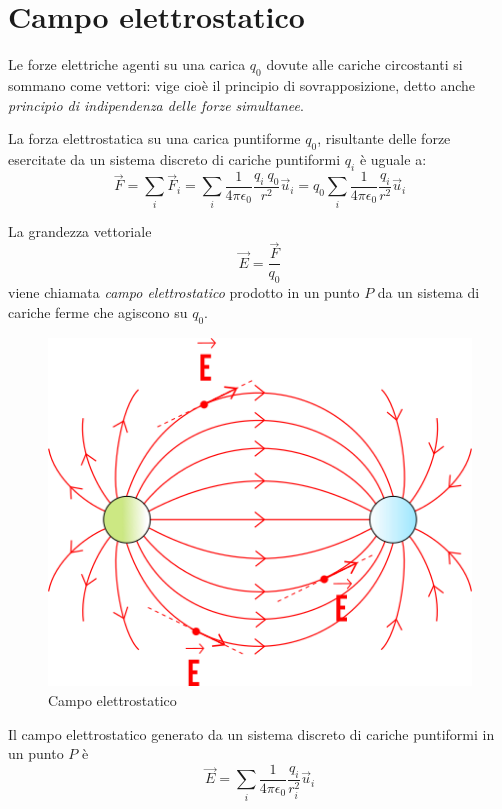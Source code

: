 \documentclass[class=book, crop=false, oneside, 12pt]{standalone}
\begin{document}
\section{Campo elettrostatico}

Le forze elettriche agenti su una carica \(q_0\) dovute alle cariche circostanti si sommano come vettori: vige cioè il principio di sovrapposizione, detto anche \emph{principio di indipendenza delle forze simultanee}.

La forza elettrostatica su una carica puntiforme \(q_0\), risultante delle forze esercitate da un sistema discreto di cariche puntiformi \(q_i\) è uguale a: 
\begin{equation}
    \overrightarrow{F} = \sum_i \overrightarrow{F}_i = \sum_i \frac{1}{4 \pi \epsilon_0} \frac{q_i \ q_0}{r^2} \overrightarrow{u}_i = q_0 \sum_i \frac{1}{4 \pi \epsilon_0} \frac{q_i}{r^2} \overrightarrow{u}_i  
\end{equation}

La grandezza vettoriale
\begin{equation}
    \overrightarrow{E} = \frac{\overrightarrow{F}}{q_0}
\end{equation}
viene chiamata \emph{campo elettrostatico} prodotto in un punto \(P\) da un sistema di cariche ferme che agiscono su \(q_0\).

\begin{figure}[h]
    \includegraphics[scale=0.4]{campo-elettrico-linee-di-campo-elettrico}
    \centering
    \caption{Campo elettrostatico}
\end{figure}

Il campo elettrostatico generato da un sistema discreto di cariche puntiformi in un punto \(P\) è
\begin{equation}
    \overrightarrow{E} =\sum_i \frac{1}{4 \pi \epsilon_0} \frac{q_i}{r_i^2} \overrightarrow{u}_i
\end{equation}
\end{document}
